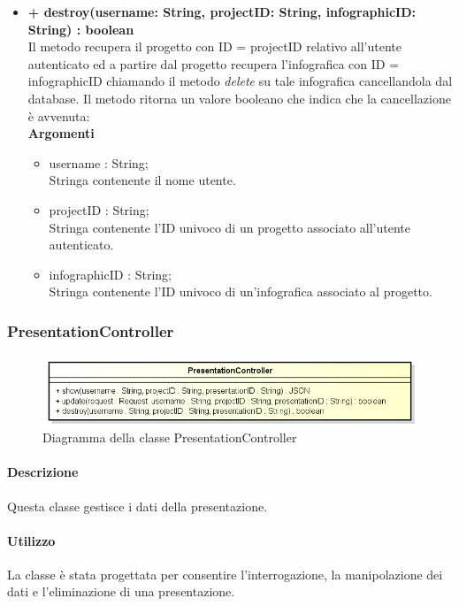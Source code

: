 \begin{itemize}
			\item \textbf{+ destroy(username: String, projectID: String, infographicID: String) : boolean}\\
			Il metodo recupera il progetto con ID = projectID relativo all'utente autenticato ed a partire dal progetto recupera l'infografica con ID = infographicID chiamando il metodo \textit{delete} su tale infografica cancellandola dal database. Il metodo ritorna un valore booleano che indica che la cancellazione è avvenuta:\\
			\textbf{Argomenti}
			\begin{itemize}
				\item username : String; \\
				Stringa contenente il nome utente.
				\item projectID : String; \\
				Stringa contenente l'ID univoco di un progetto associato all'utente autenticato.
				\item infographicID : String; \\
				Stringa contenente l'ID univoco di un'infografica associato al progetto.
			\end{itemize}
		\end{itemize}
		
\newpage
\subsubsection{PresentationController}
\begin{figure}[h]
\centering
\includegraphics[width=0.8\linewidth]{img/back_end_http_controllers_presentationController}
\caption[Diagramma della classe PresentationController]{Diagramma della classe PresentationController}
\end{figure}


	\paragraph{Descrizione}
		Questa classe gestisce i dati della presentazione.
	\paragraph{Utilizzo}
		La classe è stata progettata per consentire l'interrogazione, la manipolazione dei dati e l'eliminazione di una presentazione.
	
